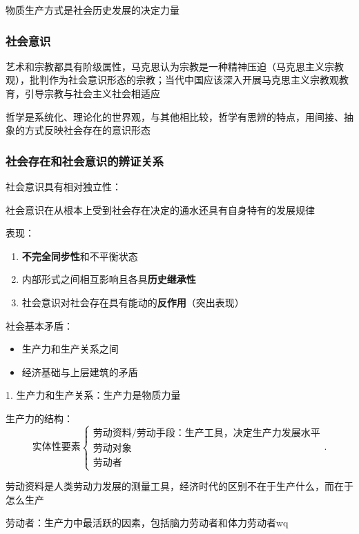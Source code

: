 \begin{notation}
    物质生产方式是社会历史发展的决定力量
\end{notation}
\subsubsection*{社会意识}%
\label{subsub:社会意识}
艺术和宗教都具有阶级属性，马克思认为宗教是一种精神压迫（马克思主义宗教观），批判作为社会意识形态的宗教；当代中国应该深入开展马克思主义宗教观教育，引导宗教与社会主义社会相适应

哲学是系统化、理论化的世界观，与其他相比较，哲学有思辨的特点，用间接、抽象的方式反映社会存在的意识形态

\subsubsection*{社会存在和社会意识的辨证关系}%
\label{subsub:社会存在和社会意识的辨证关系}
社会意识具有相对独立性：
\begin{notation}
社会意识在从根本上受到社会存在决定的通水还具有自身特有的发展规律
\end{notation}
表现：
\begin{enumerate}
    \item \textbf{不完全同步性}和不平衡状态
    \item 内部形式之间相互影响且各具\textbf{历史继承性}
    \item 社会意识对社会存在具有能动的\textbf{反作用}（突出表现）
\end{enumerate}
\begin{notation}
    社会基本矛盾：
    \begin{itemize}
        \item 生产力和生产关系之间
        \item 经济基础与上层建筑的矛盾
    \end{itemize}
\end{notation}
1. 生产力和生产关系：生产力是物质力量

生产力的结构：
\[
    \text{实体性要素}
    \begin{cases}
        \text{劳动资料/劳动手段：生产工具，决定生产力发展水平}\\
        \text{劳动对象}\\
        \text{劳动者}
    \end{cases}
.\]
\begin{notation}
    劳动资料是人类劳动力发展的测量工具，经济时代的区别不在于生产什么，而在于怎么生产
\end{notation}
\begin{notation}
劳动者：生产力中最活跃的因素，包括脑力劳动者和体力劳动者wq
\end{notation}
